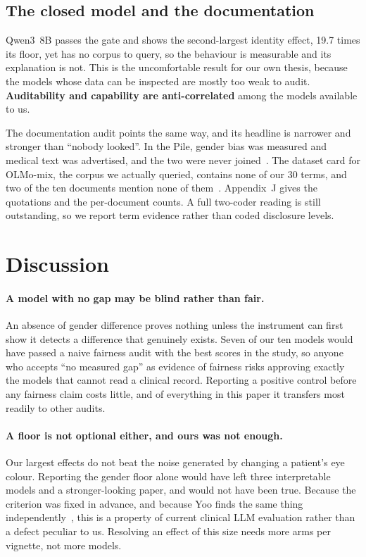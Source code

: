 \documentclass[11pt,twocolumn]{article}
\begin{document}
\subsection{The closed model and the documentation}
\label{sec:docs}

Qwen3~8B passes the gate and shows the second-largest identity effect, 19.7
times its floor, yet has no corpus to query, so the behaviour is measurable and its
explanation is not. This is the uncomfortable result for our own thesis, because
the models whose data can be inspected are mostly too weak to audit.
\textbf{Auditability and capability are anti-correlated} among the models
available to us.

The documentation audit points the same way, and its headline is narrower and
stronger than ``nobody looked''. In the Pile, gender bias was measured and
medical text was advertised, and the two were never joined~\cite{r4,r17}. The
dataset card for OLMo-mix, the corpus we actually queried, contains none of our
30 terms, and two of the ten documents mention none of them~\cite{r7}.
Appendix~J gives the quotations and the per-document counts. A full two-coder
reading is still outstanding, so we report term evidence rather than coded
disclosure levels.
\section{Discussion}

\paragraph{A model with no gap may be blind rather than fair.} An absence of
gender difference proves nothing unless the instrument can first show it detects
a difference that genuinely exists. Seven of our ten models would have passed a naive
fairness audit with the best scores in the study, so anyone who accepts ``no
measured gap'' as evidence of fairness risks approving exactly the models that
cannot read a clinical record.
Reporting a positive control before any fairness claim costs little, and of
everything in this paper it transfers most readily to other audits.

\paragraph{A floor is not optional either, and ours was not enough.} Our
largest effects do not beat the noise generated by changing a patient's eye
colour. Reporting the gender floor alone would have left three
interpretable models and a stronger-looking paper, and would not have been
true. Because the criterion was fixed in advance, and because Yoo finds the
same thing independently~\cite{r22}, this is a property of current clinical LLM
evaluation rather than a defect peculiar to us. Resolving an effect of this size needs more
arms per vignette, not more models.
\end{document}
